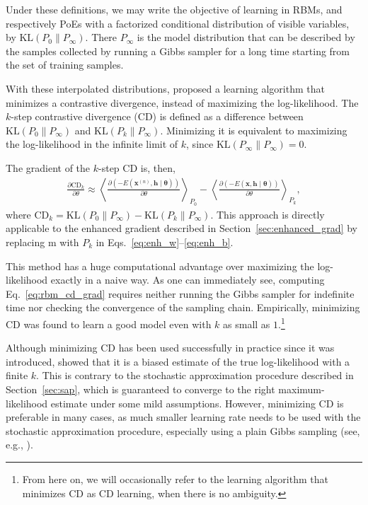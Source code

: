 \documentclass{now}
\newcommand{\vect}[1]{\mathbf{#1}}
\newcommand{\vects}[1]{\boldsymbol{#1}}
\newcommand{\vh}[0]{\vect{h}}
\newcommand{\vx}[0]{\vect{x}}
\newcommand{\tf}[0]{\text{m}}
\newcommand{\TT}[0]{{\vects{\theta}}}
\newcommand{\KL}[0]{\text{KL}}
\newcommand{\CD}[0]{\text{CD}}
\begin{document}
Under these definitions, we may write the objective of
learning in RBMs, and respectively PoEs with a factorized
conditional distribution of visible variables, by $\KL(P_0
\| P_\infty)$. There $P_\infty$ is the model distribution
that can be described by the samples collected by running a
Gibbs sampler for a long time starting from the set of training
samples.

With these interpolated distributions, \citet{Hinton2002}
proposed a learning algorithm that minimizes a contrastive
divergence, instead of maximizing the log-likelihood. 
The
$k$-step contrastive divergence
(CD) is defined as a
difference between $\KL(P_0 \| P_{\infty})$ and $\KL(P_k \|
P_\infty)$. Minimizing it is equivalent to maximizing
the log-likelihood in the infinite limit of $k$, since
$\KL(P_\infty \| P_\infty) = 0$.

The gradient of the $k$-step CD is, then,
\begin{align}
    \label{eq:rbm_cd_grad}
    \frac{\partial \CD_k}{\partial \theta} \approx
    \left< \frac{\partial
    \left(-E(\vx^{(n)}, \vh\mid\TT)\right)}{\partial \theta}
    \right>_{P_0} 
    -
    \left< \frac{\partial
    \left(-E(\vx, \vh\mid\TT)\right)}{\partial \theta}
    \right>_{P_k},
\end{align}
where $\CD_k = \KL(P_0 \| P_{\infty}) - \KL(P_k
\| P_\infty)$. This approach is directly applicable to the
enhanced gradient described in
Section~\ref{sec:enhanced_grad} by replacing $\tf$ with
$P_k$ in Eqs.~\eqref{eq:enh_w}--\eqref{eq:enh_b}.

This method has a huge computational advantage over
maximizing the log-likelihood exactly in a naive way. As one
can immediately see, computing Eq.~\eqref{eq:rbm_cd_grad}
requires neither running the Gibbs sampler for indefinite
time nor checking the convergence of the sampling chain.
Empirically, minimizing CD was found to learn a good model
even with $k$ as small as $1$.\footnote{ From here on, we
will occasionally refer to the learning algorithm that
minimizes CD as CD learning, when there is no ambiguity.}

Although minimizing CD has been used successfully in
practice since it was introduced,
\cite{Carreira-Perpinan2005,Bengio2009} showed that it is a
biased estimate of the true log-likelihood with a finite
$k$. This is contrary to the stochastic approximation
procedure described in Section~\ref{sec:sap}, which is
guaranteed to converge to the right maximum-likelihood
estimate under some mild assumptions. However, minimizing CD
is preferable in many cases,
as
much smaller learning rate needs to be used with the
stochastic approximation procedure, especially using a plain
Gibbs sampling (see, e.g., \citep{Hinton2012rbm}).
\end{document}
